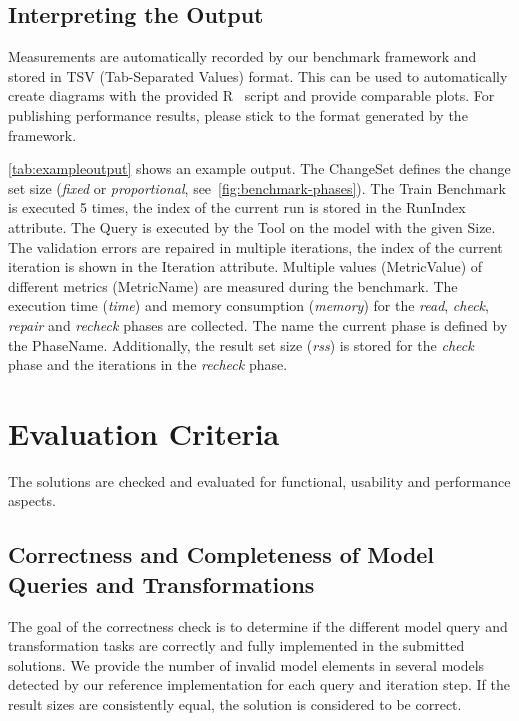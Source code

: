 \documentclass[submission,copyright,creativecommons]{eptcs}
\newcommand{\figref}[1]{\autoref{fig:#1}}
\begin{document}
\subsection{Interpreting the Output}

Measurements are automatically recorded by our benchmark framework and stored in TSV (Tab-Separated Values) format. This can be used to automatically create diagrams with the provided R~\cite{RProject} script and provide comparable plots. For publishing performance results, please stick to the format generated by the framework.

\autoref{tab:exampleoutput} shows an example output. The \textsf{ChangeSet} defines the change set size (\emph{fixed} or \emph{proportional}, see~\figref{benchmark-phases}). The Train Benchmark is executed 5 times, the index of the current run is stored in the \textsf{RunIndex} attribute. The \textsf{Query} is executed by the \textsf{Tool} on the model with the given \textsf{Size}. The validation errors are repaired in multiple iterations, the index of the current iteration is shown in the \textsf{Iteration} attribute. Multiple values (\textsf{MetricValue}) of different metrics (\textsf{MetricName}) are measured during the benchmark. The execution time (\textit{time}) and memory consumption (\textit{memory}) for the \textit{read}, \textit{check}, \textit{repair} and \textit{recheck} phases are collected. The name the current phase is defined by the \textsf{PhaseName}. Additionally, the result set size (\textit{rss}) is stored for the \textit{check} phase and the iterations in the \textit{recheck} phase.

\section{Evaluation Criteria}

The solutions are checked and evaluated for functional, usability and performance aspects.

\subsection{Correctness and Completeness of Model Queries and Transformations}
The goal of the correctness check is to determine if the different model query and transformation tasks are correctly and fully implemented in the submitted solutions.
We provide the number of invalid model elements in several models detected by our reference implementation for each query and iteration step. If the result sizes are consistently equal, the solution is considered to be correct.
\end{document}
